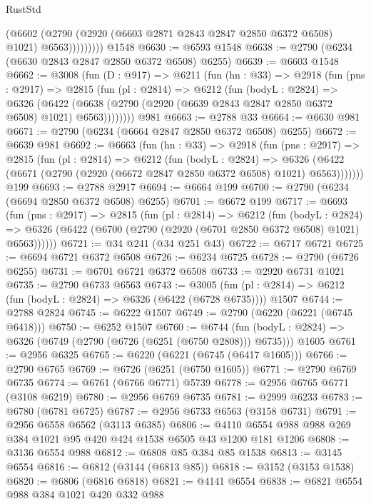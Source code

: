 \begin{lexlean}{RustStd}
\begin{coremodule}
{\begin{coremodule}
{{{{{{{{{{{{{{{{{{{{{{{{{{                  (@6602
                    (@2790 (@2920 (@6603 @2871 @2843 @2847 @2850 @6372 @6508) @1021) @6563)))))))))
    @1548
@6630 := @6593 @1548
@6638 := @2790 (@6234 (@6630 @2843 @2847 @2850 @6372 @6508) @6255)
@6639 := @6603 @1548
@6662 := @3008
    (fun (D : @917) =>
    @6211
      (fun (hn : @33) =>
      @2918
        (fun (pns : @2917) =>
        @2815
          (fun (pl : @2814) =>
          @6212
            (fun (bodyL : @2824) =>
            @6326
              (@6422 (@6638 (@2790 (@2920 (@6639 @2843 @2847 @2850 @6372 @6508) @1021) @6563))))))))
    @981
@6663 := @2788 @33
@6664 := @6630 @981
@6671 := @2790 (@6234 (@6664 @2847 @2850 @6372 @6508) @6255)
@6672 := @6639 @981
@6692 := @6663
    (fun (hn : @33) =>
    @2918
      (fun (pns : @2917) =>
      @2815
        (fun (pl : @2814) =>
        @6212
          (fun (bodyL : @2824) =>
          @6326 (@6422 (@6671 (@2790 (@2920 (@6672 @2847 @2850 @6372 @6508) @1021) @6563)))))))
    @199
@6693 := @2788 @2917
@6694 := @6664 @199
@6700 := @2790 (@6234 (@6694 @2850 @6372 @6508) @6255)
@6701 := @6672 @199
@6717 := @6693
    (fun (pns : @2917) =>
    @2815
      (fun (pl : @2814) =>
      @6212
        (fun (bodyL : @2824) =>
        @6326 (@6422 (@6700 (@2790 (@2920 (@6701 @2850 @6372 @6508) @1021) @6563))))))
@6721 := @34 @241 (@34 @251 @43)
@6722 := @6717 @6721
@6725 := @6694 @6721 @6372 @6508
@6726 := @6234 @6725
@6728 := @2790 (@6726 @6255)
@6731 := @6701 @6721 @6372 @6508
@6733 := @2920 @6731 @1021
@6735 := @2790 @6733 @6563
@6743 := @3005
    (fun (pl : @2814) => @6212 (fun (bodyL : @2824) => @6326 (@6422 (@6728 @6735))))
    @1507
@6744 := @2788 @2824
@6745 := @6222 @1507
@6749 := @2790 (@6220 (@6221 (@6745 @6418)))
@6750 := @6252 @1507
@6760 := @6744
    (fun (bodyL : @2824) => @6326 (@6749 (@2790 (@6726 (@6251 (@6750 @2808))) @6735)))
    @1605
@6761 := @2956 @6325
@6765 := @6220 (@6221 (@6745 (@6417 @1605)))
@6766 := @2790 @6765
@6769 := @6726 (@6251 (@6750 @1605))
@6771 := @2790 @6769 @6735
@6774 := @6761 (@6766 @6771) @5739
@6778 := @2956 @6765 @6771 (@3108 @6219)
@6780 := @2956 @6769 @6735
@6781 := @2999 @6233
@6783 := @6780 (@6781 @6725)
@6787 := @2956 @6733 @6563 (@3158 @6731)
@6791 := @2956 @6558 @6562 (@3113 @6385)
@6806 := @4110 @6554 @988 @988 @269 @384 @1021 @95 @420 @424 @1538 @6505 @43 @1200 @181 @1206
@6808 := @3136 @6554 @988
@6812 := @6808 @85 @384 @85 @1538
@6813 := @3145 @6554
@6816 := @6812 (@3144 (@6813 @85))
@6818 := @3152 (@3153 @1538)
@6820 := @6806 (@6816 @6818)
@6821 := @4141 @6554
@6838 := @6821
    @6554
    @988
    @384
    @1021
    @420
    @332
    @988
}}}}}}}}}}}}}}}}}}}}}}}}}}
\end{coremodule}}
\end{coremodule}
\end{lexlean}
